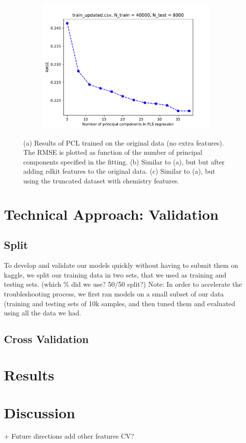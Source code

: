 \documentclass[11pt]{article}
\begin{document}
\begin{figure}[]
\begin{subfigure}[t]{0.5\textwidth}
        \includegraphics[width=\textwidth]{train_updated_N_train_40000_N_test_8000.pdf}
    \end{subfigure}
        \caption{(a) Results of PCL trained on the original data (no extra features). The RMSE is plotted as function of the number of principal components specified in the fitting. (b) Similar to (a), but but after adding rdkit features to the original data. (c) Similar to (a), but using the truncated dataset with chemistry features. }
            \label{fig:PCL}
\end{figure}

\section{Technical Approach: Validation}
    \subsection{Split}
    To develop and validate our models quickly without having to submit them on kaggle, we split our training data in two sets, that
    we used as training and testing sets. (which \% did we use? 50/50 split?)
    Note: In order to accelerate the troubleshooting process, we first ran models on a small subset of our data (training and testing sets
    of 10k samples, and then tuned them and evaluated using all the data we had.
    
    \subsection{Cross Validation}


\section{Results}


\section{Discussion}

+ Future directions
add other features
CV? 
\end{document}
